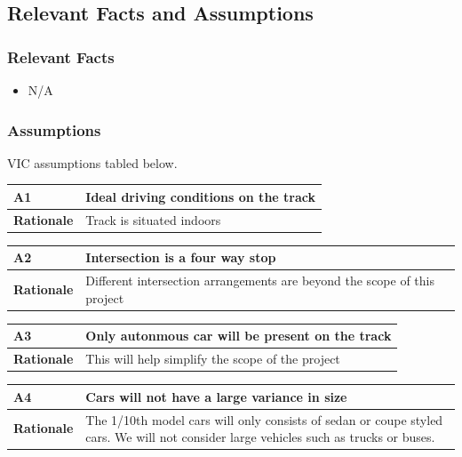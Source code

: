 \documentclass [11pt]{article}
\begin{document}
	
\subsection{Relevant Facts and Assumptions} 

\subsubsection{Relevant Facts}
\begin{itemize}
	\item N/A
\end{itemize}

\subsubsection{Assumptions}
VIC assumptions tabled below. 
\begin{longtable}{| p{ } | p{ } | }\hline 
\rowcolor{tableCell}\textbf{A1} & Ideal driving conditions on the track \\ \hline
\textbf{Rationale} & Track is situated indoors \\ \hline 
\end{longtable}

\begin{longtable}{| p{ } | p{ } | }\hline 
\rowcolor{tableCell}\textbf{A2} & Intersection is a four way stop \\ \hline
\textbf{Rationale} &  Different intersection arrangements are beyond the scope of this project \\ \hline
\end{longtable}

\begin{longtable}{| p{ } | p{ } | }\hline 
\rowcolor{tableCell}\textbf{A3} & Only autonmous car will be present on the track \\ \hline
\textbf{Rationale} &  This will help simplify the scope of the project\\ \hline
\end{longtable}

\begin{longtable}{| p{ } | p{ } | }\hline 
\rowcolor{tableCell}\textbf{A4} & Cars will not have a large variance in size \\ \hline
\textbf{Rationale} &  The 1/10th model cars will only consists of sedan or coupe styled cars. We will not consider large vehicles such as trucks or buses.\\ \hline


\end{longtable}
\end{document}
